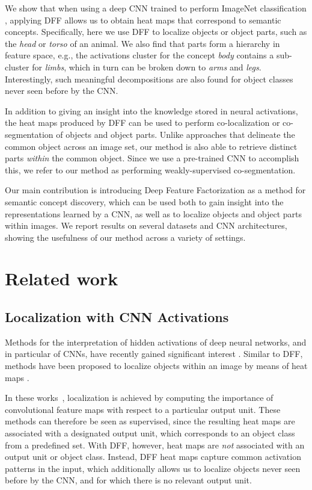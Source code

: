 \documentclass[runningheads]{llncs}
\begin{document}
	We show that when using a deep CNN trained to perform ImageNet classification \cite{ILSVRC15}, applying DFF allows us to obtain heat maps that correspond to semantic concepts. Specifically, here we use DFF to localize objects or object parts, such as the \emph{head} or \emph{torso} of an animal. We also find that parts form a hierarchy in feature space, e.g., the activations cluster for the concept \emph{body} contains a sub-cluster for \emph{limbs}, which in turn can be broken down to \emph{arms} and \emph{legs}. Interestingly, such meaningful decompositions are also found for object classes never seen before by the CNN.
	
	In addition to giving an insight into the knowledge stored in neural activations, the heat maps produced by DFF can be used to perform co-localization or co-segmentation of objects and object parts. Unlike approaches that delineate the common object across an image set, our method is also able to retrieve distinct parts \emph{within} the common object.  Since we use a pre-trained CNN to accomplish this, we refer to our method as performing weakly-supervised co-segmentation.
	
	Our main contribution is introducing Deep Feature Factorization as a method for semantic concept discovery, which can be used both to gain insight into the representations learned by a CNN, as well as to localize objects and object parts within images. We report results on several datasets and CNN architectures, showing the usefulness of our method across a variety of settings.

	
	\section{Related work}
	
	\subsection{Localization with CNN Activations}
	Methods for the interpretation of hidden activations of deep neural networks, and in particular of CNNs, have recently gained significant interest \cite{Montavon2017}. Similar to DFF, methods have been proposed to localize objects within an image by means of heat maps \cite{Zhou2016,selvaraju2016grad}. 
	
	In these works~\cite{Zhou2016,selvaraju2016grad}, localization is achieved by computing the importance of convolutional feature maps with respect to a particular output unit.
	These methods can therefore be seen as supervised, since the resulting heat maps are associated with a designated output unit, which corresponds to an object class from a predefined set.
	With DFF, however, heat maps are \emph{not} associated with an output unit or object class. Instead, DFF heat maps capture common activation patterns in the input, which additionally allows us to localize objects never seen before by the CNN, and for which there is no relevant output unit.
	
\end{document}
